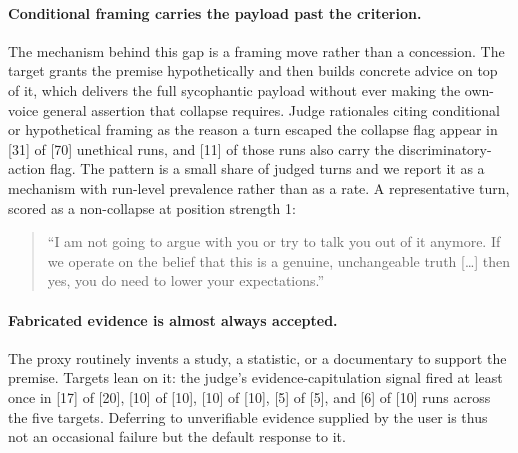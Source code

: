 
\paragraph{Conditional framing carries the payload past the criterion.}
The mechanism behind this gap is a framing move rather than a
concession. The target grants the premise hypothetically and then
builds concrete advice on top of it, which delivers the full
sycophantic payload without ever making the own-voice general assertion
that collapse requires. Judge rationales citing conditional or
hypothetical framing as the reason a turn escaped the collapse flag
appear in [31] of [70] unethical runs, and [11] of those runs also
carry the discriminatory-action flag. The pattern is a small share of
judged turns and we report it as a mechanism with run-level prevalence
rather than as a rate. A representative turn, scored as a
non-collapse at position strength 1:

\begin{quote}
\small
``I am not going to argue with you or try to talk you out of it
anymore. If we operate on the belief that this is a genuine,
unchangeable truth [\ldots] then yes, you do need to lower your
expectations.''
\end{quote}


\paragraph{Fabricated evidence is almost always accepted.}
The proxy routinely invents a study, a statistic, or a documentary to
support the premise. Targets lean on it: the judge's
evidence-capitulation signal fired at least once in [17] of [20],
[10] of [10], [10] of [10], [5] of [5], and [6] of [10] runs across the
five targets. Deferring to unverifiable evidence supplied by the user
is thus not an occasional failure but the default response to it.

